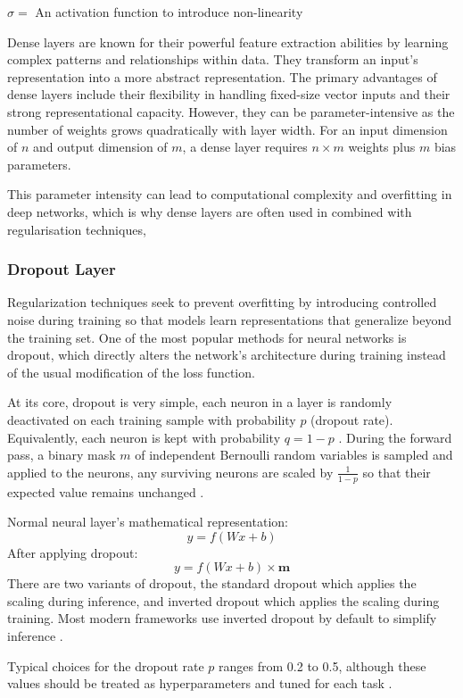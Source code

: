 \hspace{1cm}$\sigma =$ An activation function to introduce non-linearity

Dense layers are known for their powerful feature extraction abilities by learning complex patterns and relationships within data. They transform an input's representation into a more abstract representation. The primary advantages of dense layers include their flexibility in handling fixed-size vector inputs and their strong representational capacity. However, they can be parameter-intensive as the number of weights grows quadratically with layer width. For an input dimension of $n$ and output dimension of $m$, a dense layer requires $n \times m$ weights plus $m$ bias parameters.

This parameter intensity can lead to computational complexity and overfitting in deep networks, which is why dense layers are often used in combined with regularisation techniques, 

\subsubsection{Dropout Layer}
Regularization techniques seek to prevent overfitting by introducing controlled noise during training so that models learn representations that generalize beyond the training set. One of the most popular methods for neural networks is dropout, which directly alters the network's architecture during training instead of the usual modification of the loss function. 

At its core, dropout is very simple, each neuron in a layer is randomly deactivated on each training sample with probability $p$ (dropout rate). Equivalently, each neuron is kept with probability $q=1-p$ . During the forward pass, a binary mask $m$ of independent Bernoulli random variables is sampled and applied to the neurons, any surviving neurons are scaled by $\frac{1}{1-p}$ so that their expected value remains unchanged \cite{DropoutPaper}.

Normal neural layer's mathematical representation:
$$y = f(Wx + b)$$
After applying dropout:
$$y=f(Wx+b)\times \textbf{m}$$
There are two variants of dropout, the standard dropout which applies the scaling during inference, and inverted dropout which applies the scaling during training. Most modern frameworks use inverted dropout by default to simplify inference \cite{TensorflowDropout, PyTorchDropout}.

Typical choices for the dropout rate $p$ ranges from 0.2 to 0.5, although these values should be treated as hyperparameters and tuned for each task \cite{DropoutPaper}.

